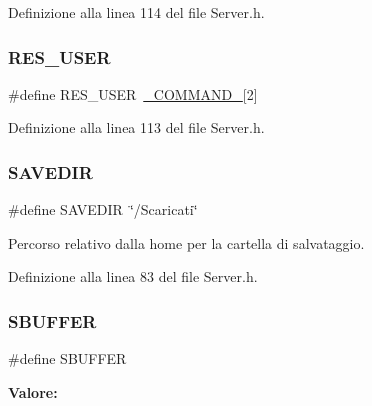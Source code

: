 Definizione alla linea 114 del file Server.\+h.

\mbox{\label{a00050_a57d31bf36eb61b82737a881bd3e8a941}} 
\subsubsection{\texorpdfstring{RES\_USER}{RES\_USER}}
{\footnotesize\ttfamily \#define R\+E\+S\+\_\+\+U\+S\+ER~\mbox{\hyperlink{a00050_ad7ed85b86ff98d7a5853304284acd79e}{\+\_\+\+C\+O\+M\+M\+A\+N\+D\+\_\+}}\mbox{[}2\mbox{]}}



Definizione alla linea 113 del file Server.\+h.

\mbox{\label{a00050_a622fe76a51e7e65de314a526dcbd535e}} 
\subsubsection{\texorpdfstring{SAVEDIR}{SAVEDIR}}
{\footnotesize\ttfamily \#define S\+A\+V\+E\+D\+IR~\char`\"{}/Scaricati\char`\"{}}



Percorso relativo dalla home per la cartella di salvataggio. 



Definizione alla linea 83 del file Server.\+h.

\mbox{\label{a00050_a7fa81987956645a88559576f6be2f51d}} 
\subsubsection{\texorpdfstring{SBUFFER}{SBUFFER}}
{\footnotesize\ttfamily \#define S\+B\+U\+F\+F\+ER}

{\bfseries Valore\+:}
\begin{DoxyCode}{0}

\end{DoxyCode}


